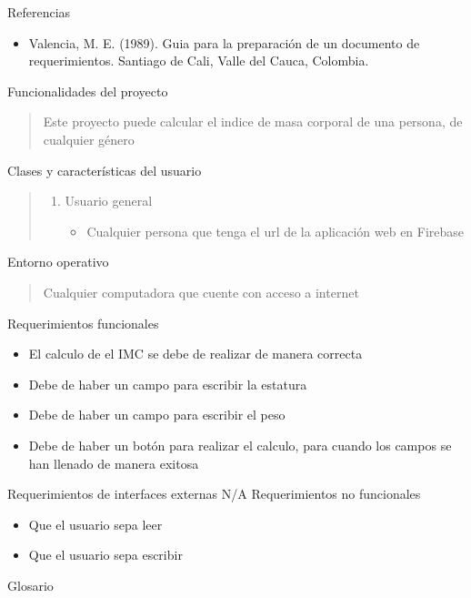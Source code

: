 \documentclass[a4paper, 12pt]{article}
\begin{document}
Referencias
\begin{itemize}
\item Valencia, M. E. (1989). Guia para la preparación de un documento de requerimientos. Santiago de Cali, Valle del Cauca, Colombia.
\end{itemize}
Funcionalidades del proyecto
\begin{verse}
Este proyecto puede calcular el indice de masa corporal de una persona, de cualquier género
\end{verse}
Clases y características del usuario
\begin{verse}
\begin{enumerate}
\item Usuario general
\begin{itemize}
\item Cualquier persona que tenga el url de la aplicación web en Firebase
\end{itemize}
\end{enumerate}
\end{verse}
Entorno operativo
\begin{verse}
Cualquier computadora que cuente con acceso a internet
\end{verse}
Requerimientos funcionales
\begin{itemize}
\item El calculo de el IMC se debe de realizar de manera correcta
\item Debe de haber un campo para escribir la estatura
\item Debe de haber un campo para escribir el peso
\item Debe de haber un botón para realizar el calculo, para cuando los campos se han llenado de manera exitosa
\end{itemize}
Requerimientos de interfaces externas
	N/A
Requerimientos no funcionales
\begin{itemize}
\item Que el usuario sepa leer
\item Que el usuario sepa escribir
\end{itemize}
Glosario
\end{document}
